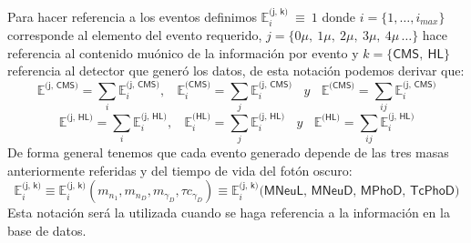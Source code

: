 Para hacer referencia a los eventos definimos $\mathbb{E}_i^\textsf{(j,~k)} ~ \equiv ~1$ donde $i = \{1, \ldots, i_{max}\}$ corresponde al elemento del evento requerido, $j = \{0\mu, ~1\mu, ~2\mu, ~3\mu, ~4\mu\, \ldots\}$ hace referencia al contenido muónico de la información por evento y $k = \{\textsf{CMS},~\textsf{HL}\}$ referencia al detector que generó los datos, de esta notación podemos derivar que:
\begin{equation}
\mathbb{E}^\textsf{(j,~CMS)} = \sum_i \mathbb{E}_i^\textsf{(j, CMS)} , ~~~~ \mathbb{E}_i^\textsf{(CMS)} = \sum_j \mathbb{E}_i^\textsf{(j, CMS)} ~~~~ y ~~~~ \mathbb{E}^\textsf{(CMS)}= \sum_{ij} \mathbb{E}_i^\textsf{(j, CMS)}
\end{equation}
\begin{equation}
\mathbb{E}^\textsf{(j, HL)} = \sum_i \mathbb{E}_i^\textsf{(j, HL)} , ~~~~ \mathbb{E}_i^\textsf{(HL)} = \sum_j \mathbb{E}_i^\textsf{(j, HL)} ~~~~ y ~~~~ \mathbb{E}^\textsf{(HL)}= \sum_{ij} \mathbb{E}_i^\textsf{(j, HL)}
\end{equation}
De forma general tenemos que cada evento generado depende de las tres masas anteriormente referidas y del tiempo de vida del fotón oscuro:
\begin{equation}
\mathbb{E}_i^\textsf{(j, k)} \equiv \mathbb{E}_i^\textsf{(j, k)}
(m_{n_1}, m_{n_D}, m_{\gamma_D}, \tau c_{\gamma_D}) 
\equiv \mathbb{E}_i^\textsf{(j, k)}\textsf{(MNeuL, MNeuD, MPhoD, TcPhoD)}
\end{equation}
Esta notación será la utilizada cuando se haga referencia a la información en la base de datos.




















